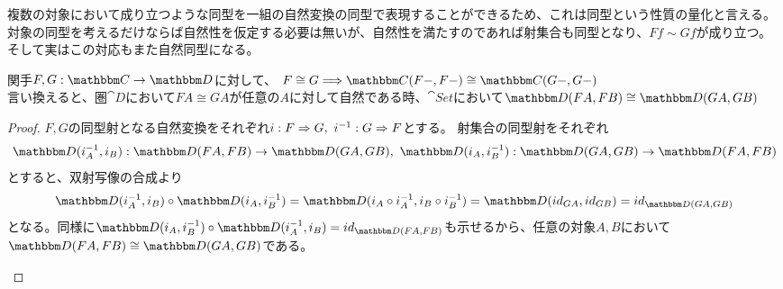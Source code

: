   複数の対象において成り立つような同型を一組の自然変換の同型で表現することができるため、これは同型という性質の量化と言える。
  対象の同型を考えるだけならば自然性を仮定する必要は無いが、自然性を満たすのであれば射集合も同型となり、$Ff\sim Gf$が成り立つ。そして実はこの対応もまた自然同型になる。
  \begin{prop}[自然同型と射集合の対応]\label{prop-corresponds-natural-isomorphic-and-arrow-set}
    関手$\functor{F,G}{C}{D}$に対して、
    $F\cong G\Longrightarrow\arset{C}{F-}{F-}\cong\arset{C}{G-}{G-}$\\
    言い換えると、圏$\cat{D}$において$FA\cong GA$が任意の$A$に対して自然である時、$\cat{Set}$において$\arset{D}{FA}{FB}\cong\arset{D}{GA}{GB}$
  \end{prop}
  \begin{proof}
    $F,G$の同型射となる自然変換をそれぞれ$i:F\Rightarrow G,\ i^{-1}:G\Rightarrow F$とする。
    射集合の同型射をそれぞれ\[\mor{\arset{D}{i^{-1}_A}{i_B}}{\arset{D}{FA}{FB}}{\arset{D}{GA}{GB}},\ \mor{\arset{D}{i_A}{i^{-1}_B}}{\arset{D}{GA}{GB}}{\arset{D}{FA}{FB}}\]とすると、双射写像の合成より\[\arset{D}{i^{-1}_A}{i_B}\circ\arset{D}{i_A}{i^{-1}_B}=\arset{D}{i_A\circ i^{-1}_A}{i_B\circ i^{-1}_B}=\arset{D}{id_{GA}}{id_{GB}}=id_{\arset{D}{GA}{GB}}\]となる。同様に$\arset{D}{i_A}{i^{-1}_B}\circ\arset{D}{i^{-1}_A}{i_B}=id_{\arset{D}{FA}{FB}}$も示せるから、任意の対象$A,B$において$\arset{D}{FA}{FB}\cong\arset{D}{GA}{GB}$である。
    \begin{center}
\end{center}
\end{proof}
